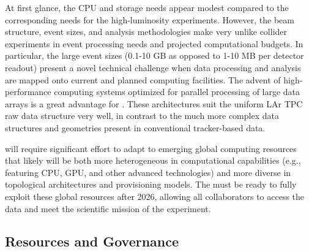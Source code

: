 At first glance,  the  CPU and storage needs %
appear modest %
compared to the corresponding needs for the high-luminosity  experiments.  
However, the  beam structure, event sizes, and analysis methodologies make  very unlike collider experiments %
in event processing needs and projected computational budgets. 
In particular, the large  event sizes (0.1-10 GB as opposed to 1-10 MB per detector readout) present a novel technical challenge when data processing and analysis are mapped onto  current and planned computing facilities. %
The advent of high-performance computing systems optimized for parallel processing of large data arrays is a great advantage for . These architectures suit the uniform LAr TPC raw data structure very well, in contrast to the much more complex data structures and geometries present in conventional tracker-based  data. 


 will require significant effort to adapt to emerging  %
global computing resources that %
  likely will be both more heterogeneous in computational capabilities (e.g., featuring CPU, GPU, and other advanced technologies) and more diverse in topological architectures and provisioning models.  The   must %
be ready to fully exploit these global resources %
after 2026, allowing all collaborators to access the data and meet the scientific mission of the experiment.  



\subsection{Resources and Governance}
\label{ch:exec-comp-gov}

